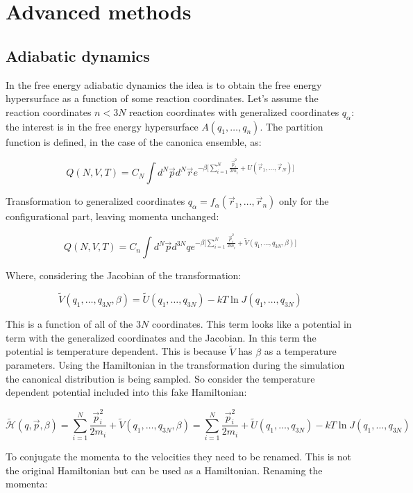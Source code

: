 \graphicspath{{chapters/20/images/}}
\chapter{Advanced methods}

\section{Adiabatic dynamics}
In the free energy adiabatic dynamics the idea is to obtain the free energy hypersurface as a function of some reaction coordinates.
Let's assume the reaction coordinates $n<3N$ reaction coordinates with generalized coordinates $q_\alpha$: the interest is in the free energy hypersurface $A(q_1, \dots, q_n)$.
The partition function is defined, in the case of the canonica ensemble, as:

$$Q(N, V, T) = C_N\int d^N\vec{p}d^N\vec{r}e^{-\beta\biggl[\sum\limits_{i=1}^N\frac{\vec{p}_i^2}{2m_i}+U(\vec{r}_1, \dots, \vec{r}_N)\biggr]}$$

Transformation to generalized coordinates $q_\alpha = f_\alpha(\vec{r}_1, \dots, \vec{r}_n)$ only for the configurational part, leaving momenta unchanged:

$$Q(N, V, T) = C_n\int d^N\vec{p}d^{3N}qe^{-\beta\biggl[\sum\limits_{i=1}^N\frac{\vec{p}_i^2}{2m_i} + \tilde{V}(q_1, \dots, q_{3N}, \beta)\biggr]}$$

Where, considering the Jacobian of the transformation:

$$\tilde{V}(q_1, \dots, q_{3N}, \beta) = \tilde{U}(q_1, \dots, q_{3N}) - kT\ln J(q_1, \dots, q_{3N})$$

This is a function of all of the $3N$ coordinates.
This term looks like a potential in term with the generalized coordinates and the Jacobian.
In this term the potential is temperature dependent.
This is because $\tilde{V}$ has $\beta$ as a temperature parameters.
Using the Hamiltonian in the transformation during the simulation the canonical distribution is being sampled.
So consider the temperature dependent potential included into this fake Hamiltonian:

$$\tilde{\mathcal{H}}(q, \vec{p}, \beta) = \sum\limits_{i=1}^N\frac{\vec{p}_i^2}{2m_i}+\tilde{V}(q_1, \dots, q_{3N}, \beta) = \sum\limits_{i=1}^N\frac{\vec{p}_i^2}{2m_i}+\tilde{U}(q_1, \dots, q_{3N})-kT\ln J(q_1, \dots, q_{3N})$$

To conjugate the momenta to the velocities they need to be renamed.
This is not the original Hamiltonian but can be used as a Hamiltonian.
Renaming the momenta:


